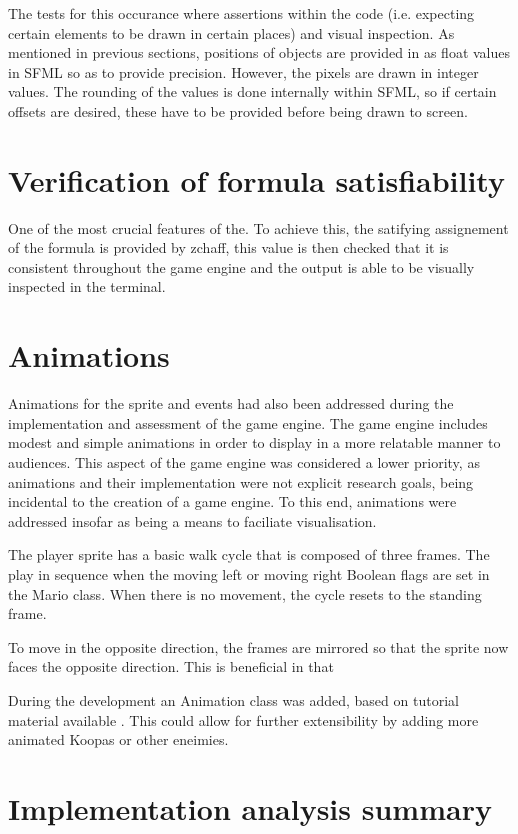 \documentclass[11pt, a4paper, oneside]{report} %
\begin{document}
The tests for this occurance where assertions within the code (i.e. expecting
certain elements to be drawn in certain places) and visual inspection. As
mentioned in previous sections, positions of objects are provided in as float
values in SFML so as to provide precision. However, the pixels are drawn in
integer values. The rounding of the values is done internally within SFML, so if
certain offsets are desired, these have to be provided before being drawn to
screen.

\section{Verification of formula satisfiability}

One of the most crucial features of the. To achieve this, the satifying
assignement of the formula is provided by zchaff, this value is then checked
that it is consistent throughout the game engine and the output is able to be
visually inspected in the terminal.

\section{Animations}

Animations for the sprite and events had also been addressed during the
implementation and assessment of the game engine. The game engine includes
modest and simple animations in order to display in a more relatable manner to
audiences. This aspect of the game engine was considered a lower priority, as
animations and their implementation were not explicit research goals, being
incidental to the creation of a game engine. To this end, animations were
addressed insofar as being a means to faciliate visualisation.

The player sprite has a basic walk cycle that is composed of three frames. The
play in sequence when the moving left or moving right Boolean flags are set in
the Mario class. When there is no movement, the cycle resets to the standing
frame.

To move in the opposite direction, the frames are mirrored so that the sprite
now faces the opposite direction. This is beneficial in that 

During the development an Animation class was added, based on tutorial material
available \cite{Haller:2013:SGD:2556030}. This could allow for further
extensibility by adding more animated Koopas or other eneimies. 


\section{Implementation analysis summary}
\end{document}
